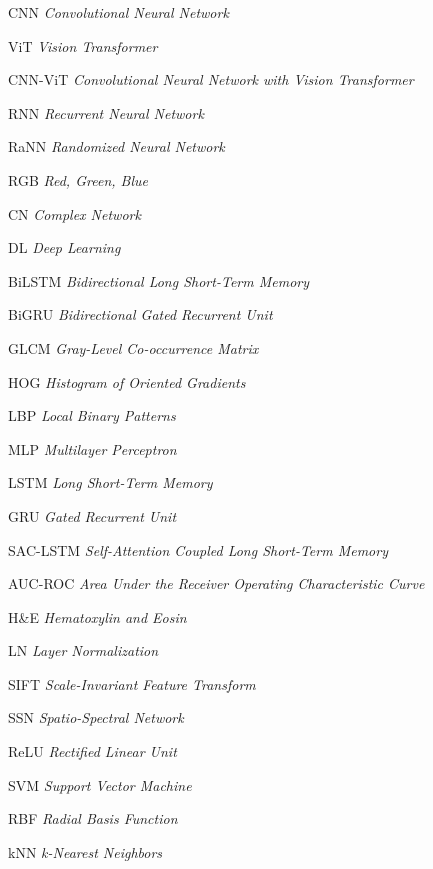 \documentclass[
  12pt,		
  a4paper,	
  openright,  
  oneside,	
  chapter=TITLE,		
  section=TITLE,		
  english,	
  french,	    
  spanish,	
  brazil	    
]{abntex2}
\begin{document}
    \begin{siglas}
        \item [CNN] \textit{Convolutional Neural Network}
        \item [ViT] \textit{Vision Transformer}
        \item [CNN-ViT] \textit{Convolutional Neural Network with Vision Transformer}
        \item [RNN] \textit{Recurrent Neural Network}
        \item [RaNN] \textit{Randomized Neural Network}
        \item [RGB] \textit{Red, Green, Blue}
        \item [CN] \textit{Complex Network}
        \item [DL] \textit{Deep Learning}
        \item [BiLSTM] \textit{Bidirectional Long Short-Term Memory}
        \item [BiGRU] \textit{Bidirectional Gated Recurrent Unit}
        \item [GLCM] \textit{Gray-Level Co-occurrence Matrix}
        \item [HOG] \textit{Histogram of Oriented Gradients}
        \item [LBP] \textit{Local Binary Patterns}
        \item [MLP] \textit{Multilayer Perceptron}
        \item [LSTM] \textit{Long Short-Term Memory}
        \item [GRU] \textit{Gated Recurrent Unit}
        \item [SAC-LSTM] \textit{Self-Attention Coupled Long Short-Term Memory}
        \item [AUC-ROC] \textit{Area Under the Receiver Operating Characteristic Curve}
        \item [H\&E] \textit{Hematoxylin and Eosin}
        \item [LN] \textit{Layer Normalization}
        \item [SIFT] \textit{Scale-Invariant Feature Transform}
        \item [SSN] \textit{Spatio-Spectral Network}
        \item [ReLU] \textit{Rectified Linear Unit}
        \item [SVM] \textit{Support Vector Machine}
        \item [RBF] \textit{Radial Basis Function}
        \item [kNN] \textit{k-Nearest Neighbors}

\end{siglas}
\end{document}
